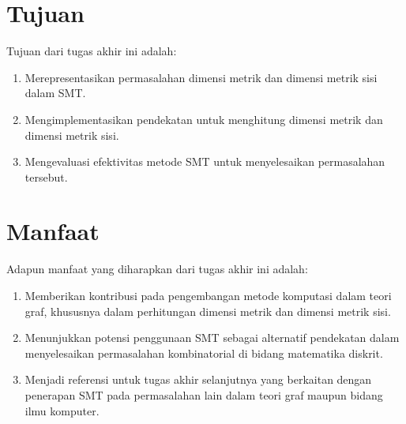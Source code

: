 \section{Tujuan}

\noindent Tujuan dari tugas akhir ini adalah:
\begin{enumerate}
	\item Merepresentasikan permasalahan dimensi metrik dan dimensi metrik sisi dalam SMT.

	\item Mengimplementasikan pendekatan untuk menghitung dimensi metrik dan dimensi metrik sisi.

	\item Mengevaluasi efektivitas metode SMT untuk menyelesaikan permasalahan tersebut.
\end{enumerate}

\section{Manfaat}

\noindent Adapun manfaat yang diharapkan dari tugas akhir ini adalah:
\begin{enumerate}
	\item Memberikan kontribusi pada pengembangan metode komputasi dalam teori graf, khususnya dalam perhitungan dimensi metrik dan dimensi metrik sisi.

	\item Menunjukkan potensi penggunaan SMT sebagai alternatif pendekatan dalam menyelesaikan permasalahan kombinatorial di bidang matematika diskrit.

	\item Menjadi referensi untuk tugas akhir selanjutnya yang berkaitan dengan penerapan SMT pada permasalahan lain dalam teori graf maupun bidang ilmu komputer.
\end{enumerate}
